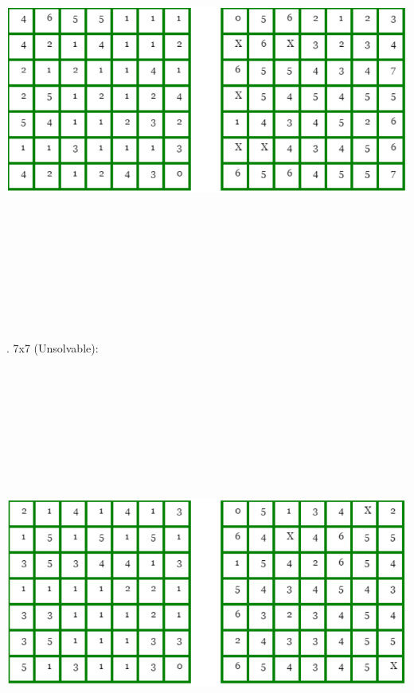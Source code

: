 \documentclass[12pt, letterpaper]{article}
\begin{document}
{\centering
	\includegraphics[width=15cm, height=15cm, keepaspectratio]{"Task 2/7x7 Puzzle (Solvable)"}
\par}

\bigskip	
{}. 7x7 (Unsolvable):

{\centering
	\includegraphics[width=15cm, height=15cm, keepaspectratio]{"Task 2/7x7 Puzzle (Unsolvable)"}
\par}
\end{document}
